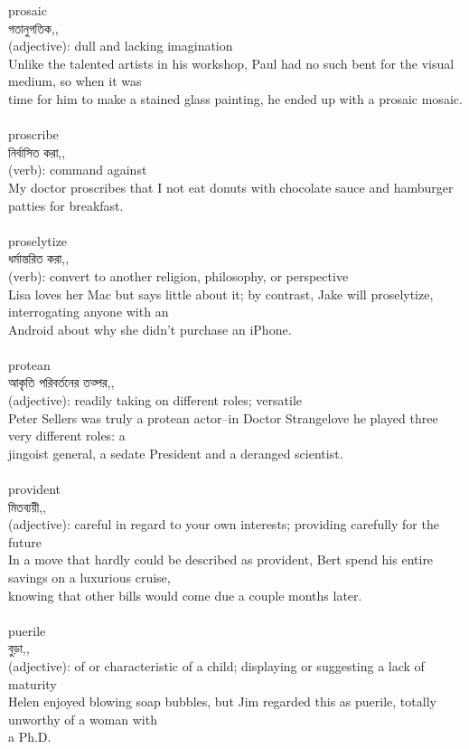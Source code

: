 \documentclass{article}
\begin{document}
{{prosaic}\\
{গতানুগতিক,,}\\
{(adjective): dull and lacking imagination\\Unlike the talented artists in his workshop, Paul had no such bent for the visual medium, so when it was\\time for him to make a stained glass painting, he ended up with a prosaic mosaic.\\}\\
{proscribe}\\
{নির্বাসিত করা,,}\\
{(verb): command against\\My doctor proscribes that I not eat donuts with chocolate sauce and hamburger patties for breakfast.\\}\\
{proselytize}\\
{ধর্মান্তরিত করা,,}\\
{(verb): convert to another religion, philosophy, or perspective\\Lisa loves her Mac but says little about it; by contrast, Jake will proselytize, interrogating anyone with an\\Android about why she didn't purchase an iPhone.\\}\\
{protean}\\
{আকৃতি পরিবর্তনের তত্পর,,}\\
{(adjective): readily taking on different roles; versatile\\Peter Sellers was truly a protean actor--in Doctor Strangelove he played three very different roles: a\\jingoist general, a sedate President and a deranged scientist.\\}\\
{provident}\\
{মিতব্যয়ী,,}\\
{(adjective): careful in regard to your own interests; providing carefully for the future\\In a move that hardly could be described as provident, Bert spend his entire savings on a luxurious cruise,\\knowing that other bills would come due a couple months later.\\}\\
{puerile}\\
{বুড়া,,}\\
{(adjective): of or characteristic of a child; displaying or suggesting a lack of maturity\\Helen enjoyed blowing soap bubbles, but Jim regarded this as puerile, totally unworthy of a woman with\\a Ph.D.\\}\\
}
\end{document}
